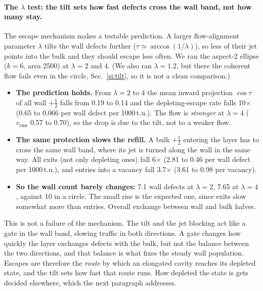 \documentclass[aps,prl,onecolumn,superscriptaddress,amsmath,amssymb,nofootinbib]{revtex4-2}
\newcommand{\half}{\tfrac12}
\begin{document}
\paragraph{The $\lambda$ test: the tilt sets how fast defects cross the wall band, not how many stay.}
The escape mechanism makes a testable prediction. A larger flow-alignment parameter $\lambda$ tilts the wall defects further ($\tau\simeq\arccos(1/\lambda)$), so less of their jet
points into the bulk and they should escape less often. We ran the aspect-2 ellipse ($k=6$, area 2500) at $\lambda=2$ and 4. (We also ran $\lambda=1.2$, but there the coherent flow
fails even in the circle, Sec.~\ref{si:tilt}, so it is not a clean comparison.)
\begin{itemize}
  \item \textbf{The prediction holds.} From $\lambda=2$ to 4 the mean inward projection $\cos\tau$ of all wall $+\half$ falls from 0.19 to 0.14 and the depleting-escape rate falls 10$\times$
        (0.65 to 0.066 per wall defect per 1000\,t.u.). The flow is \emph{stronger} at $\lambda=4$ ($v_\mathrm{rms}$ 0.57 to 0.70), so the drop is due to the tilt, not to a weaker flow.
  \item \textbf{The same protection slows the refill.} A bulk $+\half$ entering the layer has to cross the same wall band, where its jet is turned along the wall in the same way. All exits
        (not only depleting ones) fall 6$\times$ (2.81 to 0.46 per wall defect per 1000\,t.u.), and entries into a vacancy fall 3.7$\times$ (3.61 to 0.98 per vacancy).
  \item \textbf{So the wall count barely changes:} 7.1 wall defects at $\lambda=2$, 7.65 at $\lambda=4$, against 10 in a circle. The small rise is the expected one, since exits slow somewhat
        more than entries. Overall exchange between wall and bulk halves.
\end{itemize}
This is not a failure of the mechanism. The tilt and the jet blocking act like a gate in the wall band, slowing traffic in both directions. A gate changes how quickly the layer
exchanges defects with the bulk, but not the balance between the two directions, and that balance is what fixes the steady wall population. Escapes are therefore the \emph{route} by which
an elongated cavity reaches its depleted state, and the tilt sets how fast that route runs. How depleted the state is gets decided elsewhere, which the next paragraph addresses.
\end{document}
